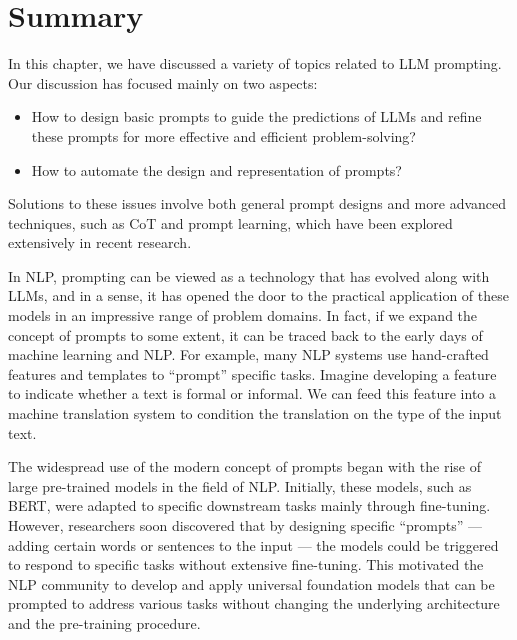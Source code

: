 
\section{Summary}

\noindent In this chapter, we have discussed a variety of topics related to LLM prompting. Our discussion has focused mainly on two aspects:

\begin{itemize}
\item \vspace{0.5em} How to design basic prompts to guide the predictions of LLMs and refine these prompts for more effective and efficient problem-solving?
\item \vspace{0.3em} How to automate the design and representation of prompts?
\end{itemize}
\vspace{0.3cm}

\noindent Solutions to these issues involve both general prompt designs and more advanced techniques, such as CoT and prompt learning, which have been explored extensively in recent research.

In NLP, prompting can be viewed as a technology that has evolved along with LLMs, and in a sense, it has opened the door to the practical application of these models in an impressive range of problem domains. In fact, if we expand the concept of prompts to some extent, it can be traced back to the early days of machine learning and NLP. For example, many NLP systems use hand-crafted features and templates to ``prompt'' specific tasks. Imagine developing a feature to indicate whether a text is formal or informal. We can feed this feature into a machine translation system to condition the translation on the type of the input text.

The widespread use of the modern concept of prompts began with the rise of large pre-trained models in the field of NLP. Initially, these models, such as BERT, were adapted to specific downstream tasks mainly through fine-tuning. However, researchers soon discovered that by designing specific ``prompts'' --- adding certain words or sentences to the input --- the models could be triggered to respond to specific tasks without extensive fine-tuning. This motivated the NLP community to develop and apply universal foundation models that can be prompted to address various tasks without changing the underlying architecture and the pre-training procedure.

